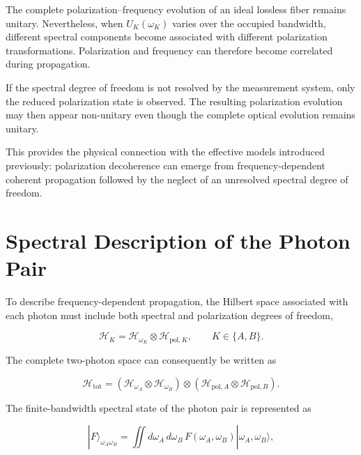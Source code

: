 The complete polarization--frequency evolution of an ideal lossless fiber remains
unitary. Nevertheless, when \(U_K(\omega_K)\) varies over the occupied bandwidth,
different spectral components become associated with different polarization
transformations. Polarization and frequency can therefore become correlated during
propagation.

If the spectral degree of freedom is not resolved by the measurement system, only
the reduced polarization state is observed. The resulting polarization evolution
may then appear non-unitary even though the complete optical evolution remains
unitary.

This provides the physical connection with the effective models introduced
previously: polarization decoherence can emerge from frequency-dependent coherent
propagation followed by the neglect of an unresolved spectral degree of freedom.



\section{Spectral Description of the Photon Pair}
\label{sec:spectral_description_spdc}

To describe frequency-dependent propagation, the Hilbert space associated with
each photon must include both spectral and polarization degrees of freedom,

\begin{equation}
\mathcal{H}_K
=
\mathcal{H}_{\omega_K}
\otimes
\mathcal{H}_{\mathrm{pol},K},
\qquad
K\in\{A,B\}.
\label{eq:single_photon_frequency_polarization_space}
\end{equation}

The complete two-photon space can consequently be written as

\begin{equation}
\mathcal{H}_{\mathrm{tot}}
=
\left(
\mathcal{H}_{\omega_A}
\otimes
\mathcal{H}_{\omega_B}
\right)
\otimes
\left(
\mathcal{H}_{\mathrm{pol},A}
\otimes
\mathcal{H}_{\mathrm{pol},B}
\right).
\label{eq:complete_frequency_polarization_hilbert_space}
\end{equation}

The finite-bandwidth spectral state of the photon pair is represented as

\begin{equation}
|F\rangle_{\omega_A\omega_B}
=
\iint
d\omega_A\,d\omega_B\,
F(\omega_A,\omega_B)
|\omega_A,\omega_B\rangle,
\label{eq:spdc_two_photon_spectral_state}
\end{equation}

